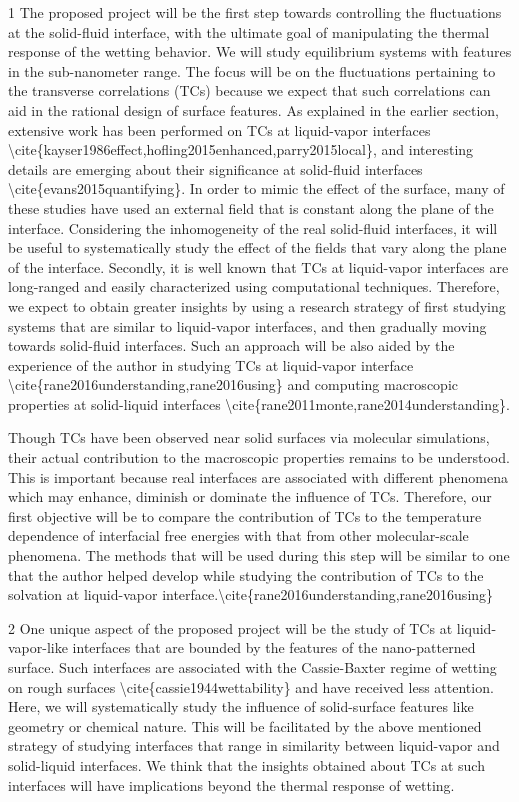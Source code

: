 \par 1 The proposed project will be the first step towards controlling the fluctuations at the solid-fluid interface, with the ultimate goal of manipulating the thermal response of the wetting behavior. We will study equilibrium systems with features in the sub-nanometer range. The focus will be on the fluctuations pertaining to the transverse correlations (TCs) because we expect that such correlations can aid in the rational design of surface features.  As explained in the earlier section, extensive work has been performed on TCs at liquid-vapor interfaces \textbackslash cite\{kayser1986effect,hofling2015enhanced,parry2015local\}, and interesting details are emerging about their significance at solid-fluid interfaces \textbackslash cite\{evans2015quantifying\}. In order to mimic the effect of the surface, many of these studies have used an external field that is constant along the plane of the interface. Considering the inhomogeneity of the real solid-fluid interfaces, it will be useful to systematically study the effect of the fields that vary along the plane of the interface. Secondly, it is well known that TCs at liquid-vapor interfaces are long-ranged and easily characterized using computational techniques. Therefore, we expect to obtain greater insights by using a research strategy of first studying systems that are similar to liquid-vapor interfaces, and then gradually moving towards solid-fluid interfaces. Such an approach will be also aided by the experience of the author in studying TCs at liquid-vapor interface \textbackslash cite\{rane2016understanding,rane2016using\} and computing macroscopic properties at solid-liquid interfaces \textbackslash cite\{rane2011monte,rane2014understanding\}.
\par Though TCs have been observed near solid surfaces via molecular simulations, their actual contribution to the macroscopic properties remains to be understood. This is important because real interfaces are associated with different phenomena which may enhance, diminish or dominate the influence of TCs. Therefore, our first objective will be to compare the contribution of TCs to the temperature dependence of interfacial free energies with that from other molecular-scale phenomena. The methods that will be used during this step will be similar to one that the author helped develop while studying the contribution of TCs to the solvation at liquid-vapor interface.\textbackslash cite\{rane2016understanding,rane2016using\}
\par 2 One unique aspect of the proposed project will be the study of TCs at liquid-vapor-like interfaces that are bounded by the features of the nano-patterned surface. Such interfaces are associated with the Cassie-Baxter regime of wetting on rough surfaces \textbackslash cite\{cassie1944wettability\} and have received less attention. Here, we will systematically study the influence of solid-surface features like geometry or chemical nature. This will be facilitated by the above mentioned strategy of studying interfaces that range in similarity between liquid-vapor and solid-liquid interfaces. We think that the insights obtained about TCs at such interfaces will have implications beyond the thermal response of wetting.
